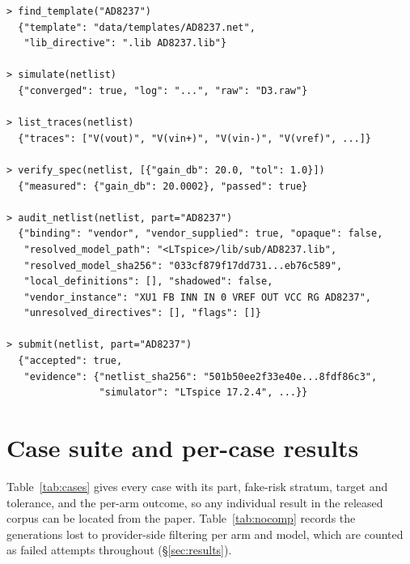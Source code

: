 \begin{lstlisting}[language={}, caption={The provenance-aware framework driven end to end as
  tool calls on case D3. Elided fields are marked \texttt{...}; the full
  record is in the artifact. \texttt{submit} labels a result
  provenance-qualified only when the numeric targets are met \emph{and} the
  provenance binding resolves.},
  label={lst:trace}]
> find_template("AD8237")
  {"template": "data/templates/AD8237.net",
   "lib_directive": ".lib AD8237.lib"}

> simulate(netlist)
  {"converged": true, "log": "...", "raw": "D3.raw"}

> list_traces(netlist)
  {"traces": ["V(vout)", "V(vin+)", "V(vin-)", "V(vref)", ...]}

> verify_spec(netlist, [{"gain_db": 20.0, "tol": 1.0}])
  {"measured": {"gain_db": 20.0002}, "passed": true}

> audit_netlist(netlist, part="AD8237")
  {"binding": "vendor", "vendor_supplied": true, "opaque": false,
   "resolved_model_path": "<LTspice>/lib/sub/AD8237.lib",
   "resolved_model_sha256": "033cf879f17dd731...eb76c589",
   "local_definitions": [], "shadowed": false,
   "vendor_instance": "XU1 FB INN IN 0 VREF OUT VCC RG AD8237",
   "unresolved_directives": [], "flags": []}

> submit(netlist, part="AD8237")
  {"accepted": true,
   "evidence": {"netlist_sha256": "501b50ee2f33e40e...8fdf86c3",
                "simulator": "LTspice 17.2.4", ...}}
\end{lstlisting}
\section{Case suite and per-case results}
\label{app:cases}

Table~\ref{tab:cases} gives every case with its part, fake-risk stratum,
target and tolerance, and the per-arm outcome, so any individual result in the
released corpus can be located from the paper. Table~\ref{tab:nocomp} records
the generations lost to provider-side filtering per arm and model, which are
counted as failed attempts throughout (\S\ref{sec:results}).

